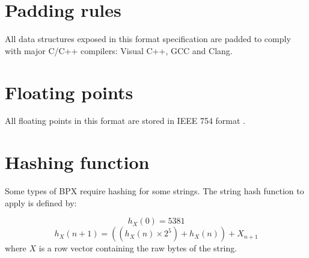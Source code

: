\section{Padding rules}
All data structures exposed in this format specification are padded to comply with major C/C++ compilers: Visual C++, GCC and Clang.

\section{Floating points}
All floating points in this format are stored in IEEE 754 format \cite{ieee754}.

\section{Hashing function}
Some types of BPX require hashing for some strings. The string hash function to apply is defined by:

\begin{equation}
	h_X(0) = 5381
\end{equation}
\begin{equation}
	h_X(n + 1) = \left( \left( h_X(n) \times 2^5 \right) + h_X(n) \right) + X_{n + 1}
\end{equation}
where $X$ is a row vector containing the raw bytes of the string.